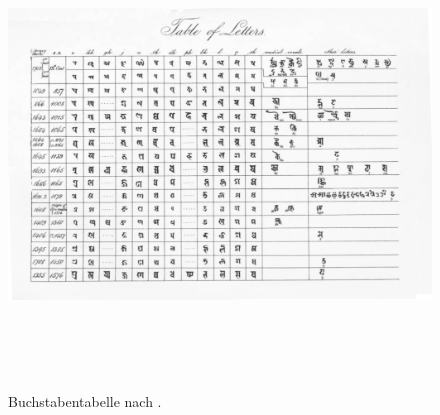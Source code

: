 \documentclass[a4paper,12pt]{article}
\begin{document}
{\begin{figure}[ht]
	\centering
  \includegraphics[width=1\textwidth, height=350pt]{bendall1.jpg}
	\caption{Buchstabentabelle nach \parencite[233]{bendall1992}.}
	\label{fig1}
\end{figure}
 
}
\end{document}
